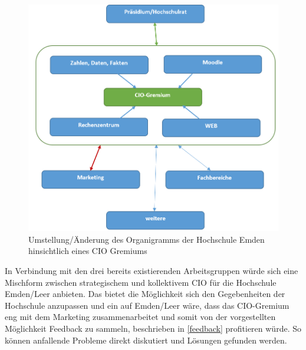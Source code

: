 \begin{figure}[h!]
	\centering
	\includegraphics[width=\textwidth]
	{kapitel/gruppe3/bilder/moegliches_cio_gremium}
	\caption{Umstellung/Änderung des Organigramms der Hochschule Emden 	hinsichtlich eines CIO Gremiums}	
	\label{fig_moegliches_gremium}
\end{figure}

In Verbindung mit den drei bereits existierenden Arbeitsgruppen würde sich eine Mischform zwischen strategischem und kollektivem CIO für die Hochschule Emden/Leer anbieten. Das bietet die Möglichkeit sich den Gegebenheiten der Hochschule anzupassen und ein auf Emden/Leer wäre, dass das CIO-Gremium eng mit dem Marketing zusammenarbeitet und somit von der vorgestellten Möglichkeit Feedback zu sammeln, beschrieben in \ref{feedback} profitieren würde. So können anfallende Probleme direkt diskutiert und Lösungen gefunden werden. 


